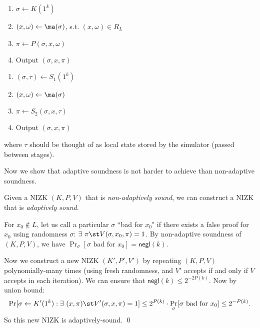 \medskip
\begin{minipage}{0.5\textwidth}
    \begin{enumerate}[itemsep=0pt]
        \item $\sigma \gets K(1^k)$
        \item $(x, \omega) \gets \ma(\sigma)$, s.t. $(x, \omega) \in R_L$
        \item $\pi \gets P(\sigma, x, \omega)$
        \item Output $(\sigma, x, \pi)$
    \end{enumerate}
\end{minipage}
\begin{minipage}{0.5\textwidth}
    \begin{enumerate}[itemsep=0pt]
        \item $(\sigma, \tau) \gets S_1(1^k)$
        \item $(x, \omega) \gets \ma(\sigma)$
        \item $\pi \gets S_2(\sigma, x, \tau)$
        \item Output $(\sigma, x, \pi)$
    \end{enumerate}
\end{minipage}

\medskip
\noindent where $\tau$ should be thought of as local state stored by the simulator (passed
    between stages).

\bigskip
Now we show that adaptive soundness is not harder to achieve than non-adaptive soundness.
\begin{theorem}\label{thm:amplify-soundness}
    Given a NIZK $(K, P, V)$ that is \emph{non-adaptively sound}, we can
    construct a NIZK that is \emph{adaptively sound}.
\end{theorem}
\proof
For $x_0 \not\in L$, let us call a particular $\sigma$ ``bad for $x_0$" if 
there exists a false proof for $x_0$ using randomness $\sigma$:
$\exists~ \pi \st V(\sigma, x_0, \pi) = 1$.
By non-adaptive soundness of $(K, P, V)$, we have
$\Pr_\sigma[\sigma \text{ bad for } x_0] = \mathsf{negl}(k)$.

Now we construct a new NIZK $(K',P',V')$ by repeating $(K,P,V)$ polynomially-many times
(using fresh randomness, and $V'$ accepts if and only if $V$ accepts in each iteration).
We can ensure that $\mathsf{negl}(k) \leq 2^{-2P(k)}$.
Now by  union bound:
$$
\Pr[\sigma \gets K'(1^k): \exists~ (x, \pi) \st V'(\sigma, x, \pi) = 1] \leq
2^{P(k)}\cdot \Pr_\sigma[\sigma \text{ bad for } x_0] \leq 2^{-P(k)}.$$
So this new NIZK is adaptively-sound. \qed



